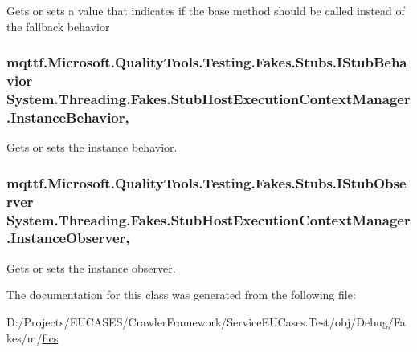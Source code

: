 Gets or sets a value that indicates if the base method should be called instead of the fallback behavior

\hypertarget{class_system_1_1_threading_1_1_fakes_1_1_stub_host_execution_context_manager_a55e79aa4159513deae52b116288e81c5}{
\subsubsection[{Instance\-Behavior}]{\setlength{\rightskip}{0pt plus 5cm}mqttf.\-Microsoft.\-Quality\-Tools.\-Testing.\-Fakes.\-Stubs.\-I\-Stub\-Behavior System.\-Threading.\-Fakes.\-Stub\-Host\-Execution\-Context\-Manager.\-Instance\-Behavior\hspace{0.3cm}{\ttfamily [get]}, {\ttfamily [set]}}}\label{class_system_1_1_threading_1_1_fakes_1_1_stub_host_execution_context_manager_a55e79aa4159513deae52b116288e81c5}


Gets or sets the instance behavior.

\hypertarget{class_system_1_1_threading_1_1_fakes_1_1_stub_host_execution_context_manager_a1cae8b32a395c01683c3d8a57f1ced62}{
\subsubsection[{Instance\-Observer}]{\setlength{\rightskip}{0pt plus 5cm}mqttf.\-Microsoft.\-Quality\-Tools.\-Testing.\-Fakes.\-Stubs.\-I\-Stub\-Observer System.\-Threading.\-Fakes.\-Stub\-Host\-Execution\-Context\-Manager.\-Instance\-Observer\hspace{0.3cm}{\ttfamily [get]}, {\ttfamily [set]}}}\label{class_system_1_1_threading_1_1_fakes_1_1_stub_host_execution_context_manager_a1cae8b32a395c01683c3d8a57f1ced62}


Gets or sets the instance observer.



The documentation for this class was generated from the following file\-:\begin{DoxyCompactItemize}
\item 
D\-:/\-Projects/\-E\-U\-C\-A\-S\-E\-S/\-Crawler\-Framework/\-Service\-E\-U\-Cases.\-Test/obj/\-Debug/\-Fakes/m/\hyperlink{m_2f_8cs}{f.\-cs}\end{DoxyCompactItemize}
